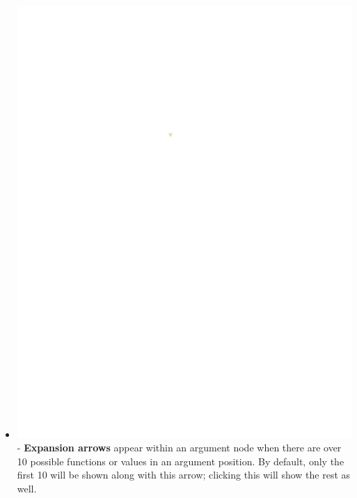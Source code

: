 \documentclass[conference]{IEEEtran}
\begin{document}
\begin{itemize}
		\item  \vspace{.25cm} \includegraphics{glossary-arrow} - \textbf{Expansion arrows} appear
		within an argument node when there are over 10 possible functions or values in
		an argument position. By default, only the first 10 will be shown along with
		this arrow; clicking this will show the rest as well.
		

\end{itemize}
\end{document}
